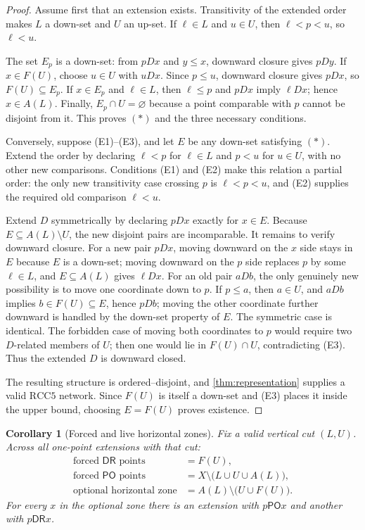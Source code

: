 \documentclass[11pt]{article}
\newtheorem{corollary}[theorem]{Corollary}
\theoremstyle{definition}
\theoremstyle{remark}
\newcommand{\RCC}{\mathrm{RCC5}}
\newcommand{\PO}{\mathsf{PO}}
\newcommand{\DR}{\mathsf{DR}}
\begin{document}
\begin{proof}
Assume first that an extension exists.  Transitivity of the extended order makes $L$ a down-set and $U$ an up-set.  If $\ell\in L$ and $u\in U$, then $\ell<p<u$, so $\ell<u$.

The set $E_p$ is a down-set: from $pDx$ and $y\leq x$, downward closure gives $pDy$.  If $x\in F(U)$, choose $u\in U$ with $uDx$.  Since $p\leq u$, downward closure gives $pDx$, so $F(U)\subseteq E_p$.  If $x\in E_p$ and $\ell\in L$, then $\ell\leq p$ and $pDx$ imply $\ell Dx$; hence $x\in A(L)$.  Finally, $E_p\cap U=\varnothing$ because a point comparable with $p$ cannot be disjoint from it.  This proves \((*)\) and the three necessary conditions.

Conversely, suppose (E1)--(E3), and let $E$ be any down-set satisfying \((*)\).  Extend the order by declaring $\ell<p$ for $\ell\in L$ and $p<u$ for $u\in U$, with no other new comparisons.  Conditions (E1) and (E2) make this relation a partial order: the only new transitivity case crossing $p$ is $\ell<p<u$, and (E2) supplies the required old comparison $\ell<u$.

Extend $D$ symmetrically by declaring $pDx$ exactly for $x\in E$.  Because $E\subseteq A(L)\setminus U$, the new disjoint pairs are incomparable.  It remains to verify downward closure.  For a new pair $pDx$, moving downward on the $x$ side stays in $E$ because $E$ is a down-set; moving downward on the $p$ side replaces $p$ by some $\ell\in L$, and $E\subseteq A(L)$ gives $\ell Dx$.  For an old pair $aDb$, the only genuinely new possibility is to move one coordinate down to $p$.  If $p\leq a$, then $a\in U$, and $aDb$ implies $b\in F(U)\subseteq E$, hence $pDb$; moving the other coordinate further downward is handled by the down-set property of $E$.  The symmetric case is identical.  The forbidden case of moving both coordinates to $p$ would require two $D$-related members of $U$; then one would lie in $F(U)\cap U$, contradicting (E3).  Thus the extended $D$ is downward closed.

The resulting structure is ordered--disjoint, and \cref{thm:representation} supplies a valid $\RCC$ network.  Since $F(U)$ is itself a down-set and (E3) places it inside the upper bound, choosing $E=F(U)$ proves existence.
\end{proof}

\begin{corollary}[Forced and live horizontal zones]\label{cor:zones}
Fix a valid vertical cut $(L,U)$.  Across all one-point extensions with that cut:
\begin{align*}
\text{forced }\DR\text{ points} &= F(U),\\
\text{forced }\PO\text{ points} &= X\setminus\bigl(L\cup U\cup A(L)\bigr),\\
\text{optional horizontal zone} &= A(L)\setminus\bigl(U\cup F(U)\bigr).
\end{align*}
For every $x$ in the optional zone there is an extension with $p\PO x$ and another with $p\DR x$.
\end{corollary}
\end{document}
